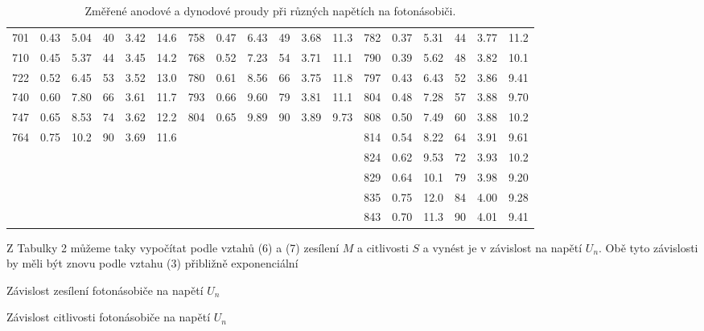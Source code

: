 \documentclass[a4paper,11pt]{article}
\begin{document}
\begin{table}[htpb]
{\begin{tabular}{ | c c c c c c | c c c c c c | c c c c c c |}
        701 & 0.43 & 5.04 & 40 & 3.42 & 14.6 & 758 & 0.47 & 6.43 & 49 & 3.68 & 11.3 & 782 & 0.37 & 5.31 & 44 & 3.77 & 11.2 \\
        710 & 0.45 & 5.37 & 44 & 3.45 & 14.2 & 768 & 0.52 & 7.23 & 54 & 3.71 & 11.1 & 790 & 0.39 & 5.62 & 48 & 3.82 & 10.1 \\
        722 & 0.52 & 6.45 & 53 & 3.52 & 13.0 & 780 & 0.61 & 8.56 & 66 & 3.75 & 11.8 & 797 & 0.43 & 6.43 & 52 & 3.86 & 9.41 \\
        740 & 0.60 & 7.80 & 66 & 3.61 & 11.7 & 793 & 0.66 & 9.60 & 79 & 3.81 & 11.1 & 804 & 0.48 & 7.28 & 57 & 3.88 & 9.70 \\
        747 & 0.65 & 8.53 & 74 & 3.62 & 12.2 & 804 & 0.65 & 9.89 & 90 & 3.89 & 9.73 & 808 & 0.50 & 7.49 & 60 & 3.88 & 10.2 \\
        764 & 0.75 & 10.2 & 90 & 3.69 & 11.6 &     &      &      &    &      &      & 814 & 0.54 & 8.22 & 64 & 3.91 & 9.61 \\
            &      &      &    &      &      &     &      &      &    &      &      & 824 & 0.62 & 9.53 & 72 & 3.93 & 10.2 \\
            &      &      &    &      &      &     &      &      &    &      &      & 829 & 0.64 & 10.1 & 79 & 3.98 & 9.20 \\
            &      &      &    &      &      &     &      &      &    &      &      & 835 & 0.75 & 12.0 & 84 & 4.00 & 9.28 \\
            &      &      &    &      &      &     &      &      &    &      &      & 843 & 0.70 & 11.3 & 90 & 4.01 & 9.41 \\
        \hline     
    \end{tabular}  
    }
    \caption{Změřené anodové a dynodové proudy při různých napětích na fotonásobiči.}
\end{table}        

Z Tabulky 2 můžeme taky vypočítat podle vztahů (6) a (7) zesílení $ M $ a citlivosti $ S $ a vynést je v závislost na napětí $ U_n $. Obě tyto závislosti by měli být znovu podle vztahu (3) přibližně exponenciální 
                   
\begin{table}[htpb]
    \begin{minipage}[b]{.45\linewidth}
        \centering
        \resizebox{1.1\textwidth}{!}{  }
        \captionsetup{type=graph}
        \caption{Závislost zesílení fotonásobiče na napětí $ U_n $}
    \end{minipage} 
    \hfill
    \begin{minipage}[b]{.45\linewidth}
        \centering
        \resizebox{1.1\textwidth}{!}{  }
        \captionsetup{type=graph}
        \caption{Závislost citlivosti fotonásobiče na napětí $ U_n $ }
    \end{minipage} 
\end{table}
\end{document}
